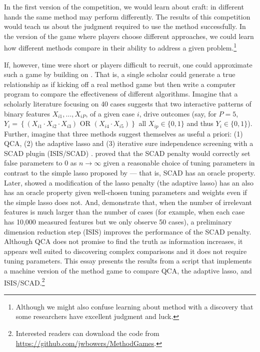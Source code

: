 \documentclass[12pt]{article}
\begin{document}
In the first version of the competition, we would learn about craft: in
different hands the same method may perform differently. The results of this
competition would teach us about the judgment required to use the method
successfully.  In the version of the game where players choose different
approaches, we could learn how different methods compare in their ability to
address a given problem.\footnote{Although we might also confuse learning
  about method with a discovery that some researchers have excellent judgment
  and luck.}

If, however, time were short or players difficult to recruit, one could
approximate such a game by building on \cite{lucasfk2014}. That is, a single
scholar could generate a true relationship as if kicking off a real method
game but then write a computer program to compare the effectiveness of
different algorithms. Imagine that a scholarly literature focusing on 40 cases
suggests that two interactive patterns of binary features $X_{i1}, \ldots,
X_{iP}$, of a given case $i$, drive outcomes (say, for $P=5$, $Y_i= \left\{
  (X_{i1} \cdot X_{i2} \cdot X_{i3} ) \text{ OR } ( X_{i4} \cdot X_{i5})
\right\}$ all $X_{ip}  \in \{0,1\}$ and thus $Y_i \in \{0,1\}$).  Further,
imagine that three methods suggest themselves as useful a priori: (1) QCA, (2)
the adaptive lasso and (3) iterative sure independence screening with a SCAD
plugin (ISIS/SCAD) \citep{fan2008sure}.  \citet{fan2001variable} proved that
the SCAD penalty would correctly set false parameters to 0 as $n \rightarrow
\infty$ given a reasonable choice of tuning parameters in contrast to the
simple lasso proposed by \cite{tibshirani1996regression} --- that is, SCAD has
an oracle property. Later, \citet{zou2006adaptive} showed a modification of
the lasso penalty (the adaptive lasso) has an also has an oracle property
given well-chosen tuning parameters and weights even if the simple lasso does
not.  And, \citet{fan2008sure} demonstrate that, when the number of irrelevant
features is much larger than the number of cases (for example, when each case
has 10,000 measured features but we only observe 50 cases), a preliminary
dimension reduction step (ISIS) improves the performance of the SCAD penalty.
Although QCA does not promise to find the truth as information increases, it
appears well suited to discovering complex comparisons and it does not require
tuning parameters. This essay presents the results from a script that
implements a machine version of the method game to compare QCA, the adaptive
lasso, and ISIS/SCAD.\footnote{Interested readers can download the code from
  \url{https://github.com/jwbowers/MethodGames}.}
\end{document}
